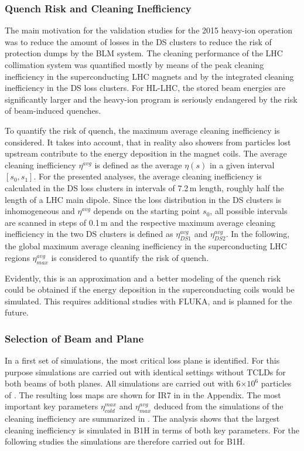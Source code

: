 \subsubsection{Quench Risk and Cleaning Inefficiency}

The main motivation for the validation studies for the 2015 heavy-ion operation was to reduce the amount of losses in the DS clusters to reduce the risk of protection dumps by the BLM system. The cleaning performance of the LHC collimation system was quantified mostly by means of the peak cleaning inefficiency in the superconducting LHC magnets and by the integrated cleaning inefficiency in the DS loss clusters. For HL-LHC, the stored beam energies are significantly larger and the heavy-ion program is seriously endangered by the risk of beam-induced quenches. 

To quantify the risk of quench, the maximum average cleaning inefficiency is considered. It takes into account, that in reality also showers from particles lost upstream contribute to the energy deposition in the magnet coils. The average cleaning inefficiency $\eta^{avg}$ is defined as the average $\eta(s)$ in a given interval $[s_0,s_1]$. For the presented analyses, the average cleaning inefficiency is calculated in the DS loss clusters in intervals of 7.2$\,$m length, roughly half the length of a LHC main dipole. Since the loss distribution in the DS clusters is inhomogeneous and  $\eta^{avg}$ depends on the starting point $s_0$, all possible intervals are scanned in steps of 0.1\,m and the respective maximum average cleaning inefficiency in the two DS clusters is defined as $\eta^{avg}_{DS1}$ and $\eta^{avg}_{DS2}$. In the following, the global maximum average cleaning inefficiency in the superconducting LHC regions $\eta^{avg}_{max}$ is considered to quantify the risk of quench. 

Evidently, this is an approximation and a better modeling of the quench risk could be obtained if the energy deposition in the superconducting coils would be simulated. This requires additional studies with FLUKA, and is planned for the future.




\subsubsection{Selection of Beam and Plane}

In a first set of simulations, the most critical loss plane is identified. For this purpose simulations are carried out with identical settings without TCLDs for both beams of both planes. All simulations are carried out with 6$\times 10^6$ particles of \lead. The resulting loss maps are shown for IR7 in  in the Appendix. The most important key parameters $\eta_{cold}^{max}$ and $\eta_{max}^{avg}$ deduced from the simulations of the cleaning inefficiency are summarized in . The analysis shows that the largest cleaning inefficiency is simulated in B1H in terms of both key parameters. For the following studies the simulations are therefore carried out for B1H. 

